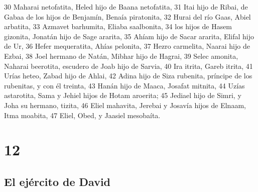 30 Maharai netofatita, Heled hijo de Baana netofatita,
31 Itai hijo de Ribai, de Gabaa de los hijos de Benjamín, Benaía piratonita,
32 Hurai del río Gaas, Abiel arbatita,
33 Azmavet barhumita, Eliaba saalbonita,
34 los hijos de Hasem gizonita, Jonatán hijo de Sage ararita,
35 Ahíam hijo de Sacar ararita, Elifal hijo de Ur,
36 Hefer mequeratita, Ahías pelonita,
37 Hezro carmelita, Naarai hijo de Ezbai,
38 Joel hermano de Natán, Mibhar hijo de Hagrai,
39 Selec amonita, Naharai beerotita, escudero de Joab hijo de Sarvia,
40 Ira itrita, Gareb itrita,
41 Urías heteo, Zabad hijo de Ahlai,
42 Adina hijo de Siza rubenita, príncipe de los rubenitas, y con él treinta,
43 Hanán hijo de Maaca, Josafat mitnita,
44 Uzías astarotita, Sama y Jehiel hijos de Hotam aroerita;
45 Jediael hijo de Simri, y Joha su hermano, tizita,
46 Eliel mahavita, Jerebai y Josavía hijos de Elnaam, Itma moabita,
47 Eliel, Obed, y Jaasiel mesobaíta.

\chapter{12}

\section*{El ejército de David}

